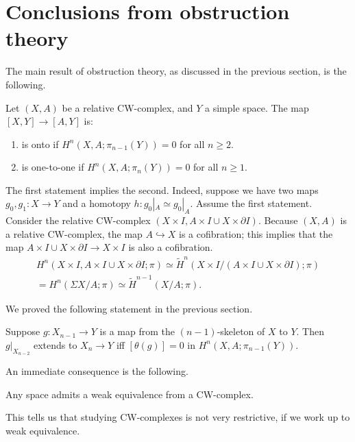 \section{Conclusions from obstruction theory}
The main result of obstruction theory, as discussed in the previous section, is
the following.
\begin{theorem}
    Let $(X,A)$ be a relative CW-complex, and $Y$ a simple space. The map
    $[X,Y]\to [A,Y]$ is:
    \begin{enumerate}
	\item is onto if $H^n(X,A;\pi_{n-1}(Y)) = 0$ for all $n\geq 2$.
	\item is one-to-one if $H^n(X,A;\pi_n(Y)) = 0$ for all $n\geq 1$.
    \end{enumerate}
\end{theorem}
\begin{remark}
    The first statement implies the second. Indeed, suppose we have two maps
    $g_0,g_1:X\to Y$ and a homotopy $h:g_0|_{A}\simeq g_0|_{A}$. Assume the
    first statement. Consider the relative CW-complex $(X\times I,A\times I\cup
    X\times\partial I)$. Because $(X,A)$ is a relative CW-complex, the map
    $A\hookrightarrow X$ is a cofibration; this implies that the map $A\times
    I\cup X\times\partial I\to X\times I$ is also a cofibration.
    \begin{align*}
	H^n(X\times I,A\times I\cup X\times\partial I;\pi)\simeq
	\widetilde{H}^n(X\times I/(A\times I\cup X\times\partial I);\pi) \\
	= H^n(\Sigma X/A;\pi)\simeq \widetilde{H}^{n-1}(X/A;\pi).
    \end{align*}
\end{remark}
We proved the following statement in the previous section.
\begin{prop}
    Suppose $g:X_{n-1}\to Y$ is a map from the $(n-1)$-skeleton of $X$ to $Y$.
    Then $g|_{X_{n-2}}$ extends to $X_n\to Y$ iff $[\theta(g)] = 0$ in
    $H^n(X,A;\pi_{n-1}(Y))$.
\end{prop}
An immediate consequence is the following.
\begin{theorem}[CW-approximation]
    Any space admits a weak equivalence from a CW-complex.
\end{theorem}
This tells us that studying CW-complexes is not very restrictive, if we work up
to weak equivalence.

